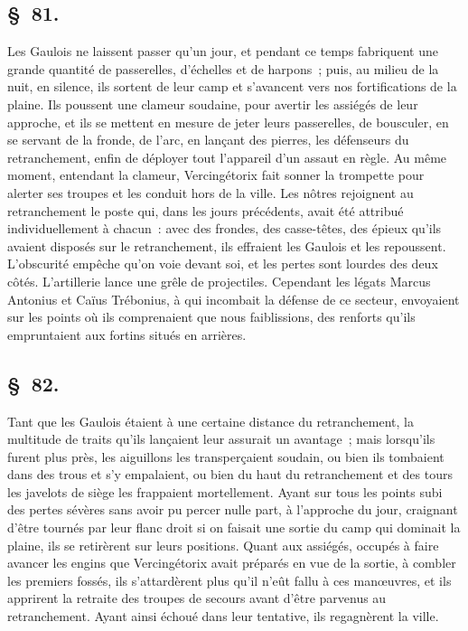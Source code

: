 \documentclass[french,twoside]{book} %
\begin{document}
\subsection[{§ 81.}]{ \textsc{§ 81.} }
\noindent Les Gaulois ne laissent passer qu’un jour, et pendant ce temps fabriquent une grande quantité de passerelles, d’échelles et de harpons ; puis, au milieu de la nuit, en silence, ils sortent de leur camp et s’avancent vers nos fortifications de la plaine. Ils poussent une clameur soudaine, pour avertir les assiégés de leur approche, et ils se mettent en mesure de jeter leurs passerelles, de bousculer, en se servant de la fronde, de l’arc, en lançant des pierres, les défenseurs du retranchement, enfin de déployer tout l’appareil d’un assaut en règle. Au même moment, entendant la clameur, Vercingétorix fait sonner la trompette pour alerter ses troupes et les conduit hors de la ville. Les nôtres rejoignent au retranchement le poste qui, dans les jours précédents, avait été attribué individuellement à chacun : avec des frondes, des casse-têtes, des épieux qu’ils avaient disposés sur le retranchement, ils effraient les Gaulois et les repoussent. L'obscurité empêche qu’on voie devant soi, et les pertes sont lourdes des deux côtés. L'artillerie lance une grêle de projectiles. Cependant les légats Marcus Antonius et Caïus Trébonius, à qui incombait la défense de ce secteur, envoyaient sur les points où ils comprenaient que nous faiblissions, des renforts qu’ils empruntaient aux fortins situés en arrières.
\subsection[{§ 82.}]{ \textsc{§ 82.} }
\noindent Tant que les Gaulois étaient à une certaine distance du retranchement, la multitude de traits qu’ils lançaient leur assurait un avantage ; mais lorsqu’ils furent plus près, les aiguillons les transperçaient soudain, ou bien ils tombaient dans des trous et s’y empalaient, ou bien du haut du retranchement et des tours les javelots de siège les frappaient mortellement. Ayant sur tous les points subi des pertes sévères sans avoir pu percer nulle part, à l’approche du jour, craignant d’être tournés par leur flanc droit si on faisait une sortie du camp qui dominait la plaine, ils se retirèrent sur leurs positions. Quant aux assiégés, occupés à faire avancer les engins que Vercingétorix avait préparés en vue de la sortie, à combler les premiers fossés, ils s’attardèrent plus qu’il n’eût fallu à ces manœuvres, et ils apprirent la retraite des troupes de secours avant d’être parvenus au retranchement. Ayant ainsi échoué dans leur tentative, ils regagnèrent la ville.
\end{document}
